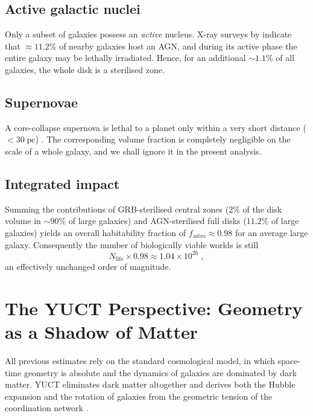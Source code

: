 \documentclass[12pt,a4paper]{article}
\begin{document}
	\subsection{Active galactic nuclei}
	\label{sec:agn}
	Only a subset of galaxies possess an \emph{active} nucleus.  X-ray
	surveys by \citet{Foord2017} indicate that $\approx 11.2\%$ of
	nearby galaxies host an AGN, and during its active phase the entire
	galaxy may be lethally irradiated.  Hence, for an additional $\sim 1.1\%$
	of all galaxies, the whole disk is a sterilised zone.
	
	\subsection{Supernovae}
	\label{sec:sne}
	A core-collapse supernova is lethal to a planet only within a very
	short distance ($< 30\;\mathrm{pc}$) \citep{ThomasYelland2023}.  The
	corresponding volume fraction is completely negligible on the scale
	of a whole galaxy, and we shall ignore it in the present analysis.
	
	\subsection{Integrated impact}
	\label{sec:total_astro}
	Summing the contributions of GRB-sterilised central zones ($2\%$ of the
	disk volume in $\sim 90\%$ of large galaxies) and AGN-sterilised full
	disks ($11.2\%$ of large galaxies) yields an overall habitability
	fraction of $f_{\mathrm{astro}} \approx 0.98$ for an average large
	galaxy.  Consequently the number of biologically viable worlds is still
	\begin{equation}
		N_{\mathrm{life}} \times 0.98 \approx 1.04\times 10^{26}\; ,
	\end{equation}
	an effectively unchanged order of magnitude.
	
	\section{The YUCT Perspective: Geometry as a Shadow of Matter}
	\label{sec:yuct_geometry}
	All previous estimates rely on the standard cosmological model, in
	which space-time geometry is absolute and the dynamics of galaxies are
	dominated by dark matter.  YUCT eliminates dark matter altogether and
	derives both the Hubble expansion and the rotation of galaxies from the
	geometric tension of the coordination network
	\citep{YUCT,AppGravity}.
	
\end{document}
